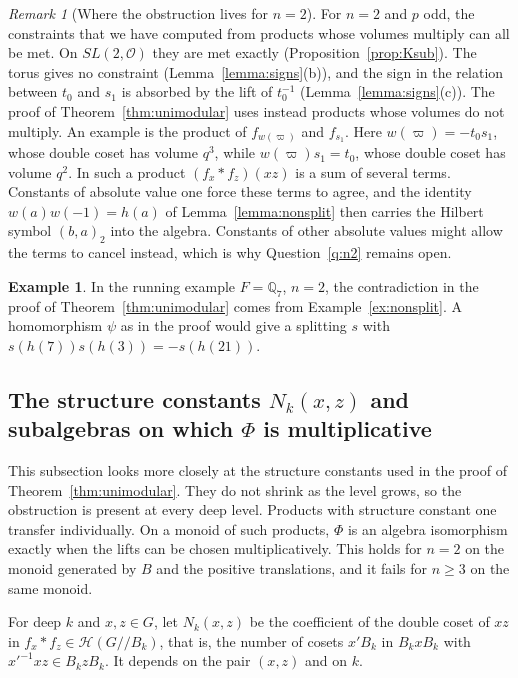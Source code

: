 \documentclass[12pt,letterpaper]{amsart}
\numberwithin{equation}{section}
\theoremstyle{definition}
\newtheorem{example}[theorem]{Example}
\theoremstyle{remark}
\newtheorem{remark}[theorem]{Remark}
\newcommand{\cO}{\mathcal{O}}
\newcommand{\cH}{\mathcal{H}}
\newcommand{\Hlin}{\cH(G/\!/B_k)}
\begin{document}
\begin{remark}[Where the obstruction lives for $n=2$]
\label{rem:n2where}
For $n=2$ and $p$ odd, the constraints that we have computed from
products whose volumes multiply can all be met. On $SL(2,\cO)$ they are
met exactly (Proposition~\ref{prop:Ksub}). The torus gives no
constraint (Lemma~\ref{lemma:signs}(b)), and the sign in the relation
between $t_0$ and $s_1$ is absorbed by the lift of $t_0^{-1}$
(Lemma~\ref{lemma:signs}(c)). The proof of Theorem~\ref{thm:unimodular}
uses instead products whose volumes do not multiply. An example is the
product of $f_{w(\varpi)}$ and $f_{s_1}$. Here $w(\varpi)=-t_0s_1$, whose
double coset has volume $q^3$, while $w(\varpi)s_1=t_0$, whose double
coset has volume $q^2$. In such a product
$(f_x*f_z)(xz)$ is a sum of several terms. Constants of absolute value
one force these terms to agree, and the identity $w(a)w(-1)=h(a)$ of
Lemma~\ref{lemma:nonsplit} then carries the Hilbert symbol $(b,a)_2$
into the algebra. Constants of other absolute values might allow the
terms to cancel instead, which is why Question~\ref{q:n2} remains open.
\end{remark}

\begin{example}
\label{ex:unimodular}
In the running example $F=\mathbb{Q}_7$, $n=2$, the contradiction in
the proof of Theorem~\ref{thm:unimodular} comes from
Example~\ref{ex:nonsplit}. A homomorphism $\psi$ as in the proof would
give a splitting $s$ with $s(h(7))s(h(3))=-s(h(21))$.
\end{example}

\subsection{The structure constants \texorpdfstring{$N_k(x,z)$}{N} and
subalgebras on which \texorpdfstring{$\Phi$}{Phi} is multiplicative}
\label{subsec:Nk}
This subsection looks more closely at the structure constants used in
the proof of Theorem~\ref{thm:unimodular}. They do not shrink as the
level grows, so the obstruction is present at every deep level.
Products with structure constant one transfer individually. On a
monoid of such products, $\Phi$ is an algebra isomorphism exactly when
the lifts can be chosen multiplicatively. This holds for $n=2$ on the
monoid generated by $B$ and the positive translations, and it fails
for $n\geq3$ on the same monoid.

For deep $k$ and $x,z\in G$, let $N_k(x,z)$ be the coefficient of the
double coset of $xz$ in $f_x*f_z\in\Hlin$, that is, the number of cosets
$x'B_k$ in $B_kxB_k$ with $x'^{-1}xz\in B_kzB_k$. It depends on the
pair $(x,z)$ and on $k$.
\end{document}
